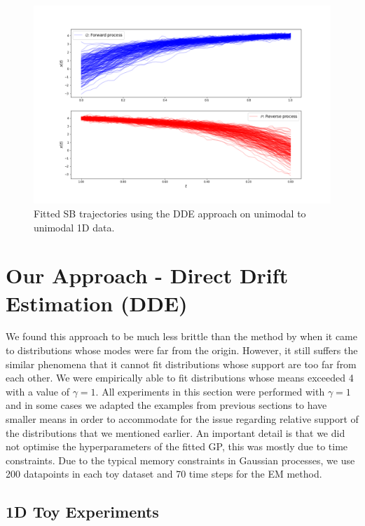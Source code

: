 \documentclass[a4paper,12pt,twoside,openright]{report}
\theoremstyle{definition}
\begin{document}
\begin{figure}[t]
    \centering
    \includegraphics[scale=0.4,trim={2.3cm 1cm 2.5cm 0}, clip]{images/GP/gp_bigvar_trajectories.png}
    \caption{ Fitted SB trajectories using the DDE approach on unimodal to unimodal 1D data.  }
    \label{fig:bigvar200trajectroies}
\end{figure}
\section{Our Approach - Direct Drift Estimation (DDE)}

We found this approach to be much less brittle than the method by \cite{pavon2018data} when it came to distributions whose modes were far from the origin. However, it still suffers the similar phenomena that it cannot fit distributions whose support are too far from each other. We were empirically able to fit distributions whose means exceeded 4 with a value of $\gamma=1$. All experiments in this section were performed with $\gamma=1$ and in some cases we adapted the examples from previous sections to have smaller means in order to accommodate for the issue regarding relative support of the distributions that we mentioned earlier. An important detail is that we did not optimise the hyperparameters of the fitted GP, this was mostly due to time constraints. Due to the typical memory constraints in Gaussian processes, we use 200 datapoints in each toy dataset and 70 time steps for the EM method.

\subsection{1D Toy Experiments }
\end{document}
